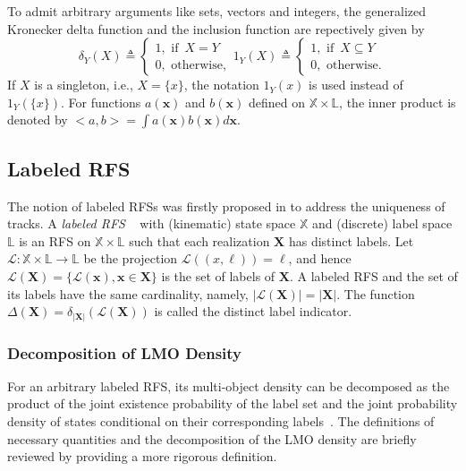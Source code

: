 \documentclass[journal]{IEEEtran}
\newcommand{\bX}{{\mathbf X}}
\newcommand{\bx}{{\mathbf x}}
\begin{document}
To admit arbitrary arguments like sets, vectors and integers, the generalized Kronecker delta function and the inclusion function are repectively given by
\begin{equation}\label{delta}
  \delta_Y(X)\triangleq\left\{\begin{array}{l}
\!\!1, \,\,\mbox{if}\,\,\,X=Y\\
\!\!0, \,\,\mbox{otherwise},
\end{array}\right.
1_Y(X)\triangleq\left\{\begin{array}{l}
\!\!1, \,\,\mbox{if}\,\,\,X\subseteq Y\\
\!\!0, \,\,\mbox{otherwise}.
\end{array}\right.
\end{equation}
If $X$ is a singleton, i.e., $X=\{x\}$, the notation $1_Y(x)$ is used instead of $1_Y(\{x\})$. For functions $a(\bx)$ and $b(\bx)$ defined on $\mathbb{X}\times\mathbb{L}$, the inner product is denoted by
$\big<a,b\big>=\int a(\bx)b(\bx)d\bx$.

\subsection{Labeled RFS}
The notion of labeled RFSs was firstly proposed in \cite{refr:label_1} to address the uniqueness of tracks.   A \textit{labeled RFS} ~\cite{refr:label_1,refr:label_2} with (kinematic) state space $\mathbb{X}$ and (discrete) label space
 $\mathbb{L}$ is an RFS on $\mathbb{X}\times\mathbb{L}$ such that each realization $\mathbf{X}$ has distinct labels. Let $\mathcal{L}: \mathbb{X}\times\mathbb{L}\!\rightarrow \!\mathbb{L}$ be the projection $\mathcal{L}((x,\ell))\!\!=\!\!\ell$, and hence $\mathcal{L}(\bX)\!\!=\!\!\{\mathcal{L}(\bx),\bx\!\!\in\!\!\bX\}$ is the set of labels of $\bX$. A labeled RFS and the set of its labels have the same cardinality, namely, $|\mathcal{L}(\mathbf{X})|\!\!=\!\!|\mathbf{X}|$. The function $\Delta(\bX)\!\!=\!\!\delta_{|\bX|}(\mathcal{L}(\bX))$ is called the distinct label indicator.
\subsubsection{Decomposition of LMO Density}
For an arbitrary labeled RFS, its multi-object density can be decomposed as the product of the joint existence probability of the label set and the  joint probability density of states conditional on their corresponding labels~\cite{refr:label_6}. 
The definitions of necessary quantities  and the decomposition of the LMO density are briefly reviewed by providing a more rigorous  definition.
\end{document}
